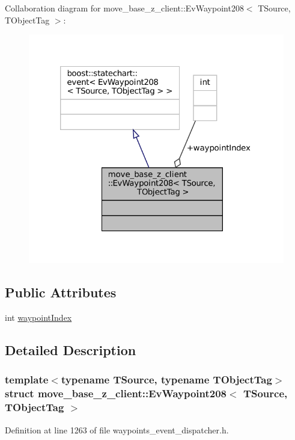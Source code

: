 Collaboration diagram for move\+\_\+base\+\_\+z\+\_\+client\+:\+:Ev\+Waypoint208$<$ T\+Source, T\+Object\+Tag $>$\+:
\nopagebreak
\begin{figure}[H]
\begin{center}
\leavevmode
\includegraphics[width=320pt]{structmove__base__z__client_1_1EvWaypoint208__coll__graph}
\end{center}
\end{figure}
\subsection*{Public Attributes}
\begin{DoxyCompactItemize}
\item 
int \hyperlink{structmove__base__z__client_1_1EvWaypoint208_af7e34d35df8705dfa1915a4c76e17f75}{waypoint\+Index}
\end{DoxyCompactItemize}


\subsection{Detailed Description}
\subsubsection*{template$<$typename T\+Source, typename T\+Object\+Tag$>$\newline
struct move\+\_\+base\+\_\+z\+\_\+client\+::\+Ev\+Waypoint208$<$ T\+Source, T\+Object\+Tag $>$}



Definition at line 1263 of file waypoints\+\_\+event\+\_\+dispatcher.\+h.




